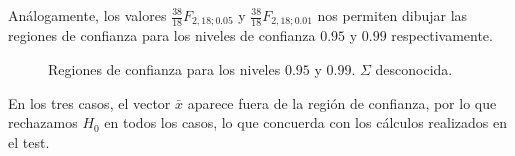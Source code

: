 \documentclass[12pt]{article}
\begin{document}
Análogamente, los valores $\frac{38}{18}F_{2,18;0.05}$ y $\frac{38}{18}F_{2,18;0.01}$ nos
permiten dibujar las regiones de confianza para los niveles de
confianza $0.95$ y $0.99$ respectivamente.
\vspace{-4mm}
\begin{figure}[H]
  \centering
  \caption{Regiones de confianza para los niveles $0.95$ y $0.99$. $\Sigma$ desconocida.}
  \label{fig:desc-005-001}
\end{figure}

En los tres casos, el vector $\bar{x}$ aparece fuera de la región de
confianza, por lo que rechazamos $H_0$ en todos los casos, lo que
concuerda con los cálculos realizados en el test.
\end{document}
